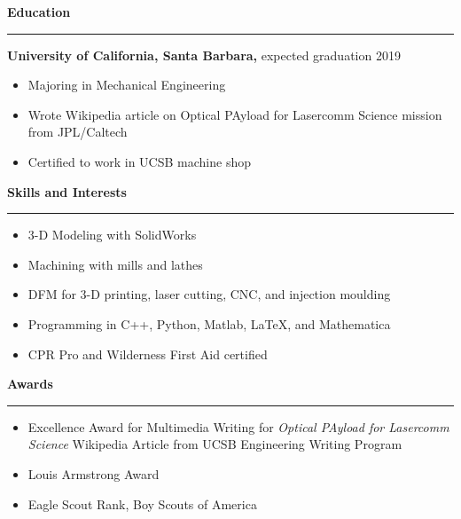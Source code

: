 \documentclass[12pt, oneside]{article}
\newcommand{\headingstyleJobs}[1] {
	{\fontsize{20pt}{1em}\selectfont \bf \textcolor{new_red}{#1}}
	\textcolor{new_red}{\rule{3.25in}{0.5pt}} \vspace{3pt}
}
\newcommand{\headingstyleSJobs}[1] {
	{\fontsize{20pt}{1em}\selectfont \bf \textcolor{new_red}{#1}}
	\textcolor{new_red}{\rule{3.25in}{0.5pt}} \vspace{-10pt}
}
\newcommand{\jobtitle}[2] {
	{\bf #1} {#2} \vspace{-10pt} \\
}
\begin{document}
\begin{flushleft}
\headingstyleJobs{Education}


\jobtitle{University of California, Santa Barbara,}{expected graduation 2019}
\begin{itemize}
	\item Majoring in Mechanical Engineering
	\item Wrote Wikipedia article on Optical PAyload for Lasercomm Science mission from JPL/Caltech \\
	\item Certified to work in UCSB machine shop
\end{itemize}


\headingstyleSJobs{Skills and Interests}

\begin{itemize}
	\item 3-D Modeling with SolidWorks \\
	\item Machining with mills and lathes \\
	\item DFM for 3-D printing, laser cutting, CNC, and injection moulding \\
	\item Programming in C++, Python, Matlab, \LaTeX, and Mathematica \\
	\item CPR Pro and Wilderness First Aid certified \\ %
\end{itemize}


\headingstyleSJobs{Awards}

\begin{itemize}
	\item Excellence Award for Multimedia Writing for \textit{Optical PAyload for Lasercomm Science} Wikipedia Article from UCSB Engineering Writing Program
	\item Louis Armstrong Award
	\item Eagle Scout Rank, Boy Scouts of America
\end{itemize}

\end{flushleft}
\end{document}
